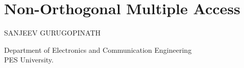 \chapter{Non-Orthogonal Multiple Access}

\begin{center}
{\large\uppercase{Sanjeev Gurugopinath}} 

\vskip -6pt

Department of Electronics and Communication Engineering\\ 
PES University.
\end{center}
\vskip 1cm

\noindent{}
\newpage

